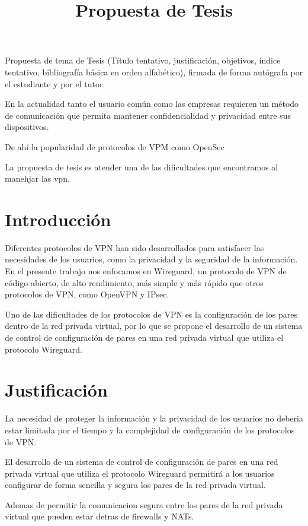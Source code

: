 \documentclass{article}
\title{Propuesta de Tesis}
\begin{document}
\maketitle

Propuesta de tema de Tesis (Título tentativo, justificación, objetivos, índice tentativo, bibliografía básica en orden alfabético), firmada de forma autógrafa por el estudiante y por el tutor.

En la actualidad tanto el usuario común como las empresas requieren un método de comunicación que permita mantener confidencialidad y privacidad entre sus dispositivos.

De ahí la popularidad de protocolos de VPM como OpenSec

La propuesta de tesis es atender una de las dificultades que encontramos al manehjar las vpn.


\section{Introducción}
Diferentes protocolos de VPN han sido desarrollados para satisfacer las necesidades de los usuarios, como la privacidad y la seguridad de la información.
En el presente trabajo nos enfocamos en Wireguard, un protocolo de VPN de código abierto, de alto rendimiento, más simple y más rápido que otros protocolos de VPN, como OpenVPN y IPsec.

Uno de las dificultades de los protocolos de VPN es la configuración de los pares dentro de la red privada virtual, por lo que se propone el desarrollo de un sistema de control de configuración de pares en una red privada virtual que utiliza el protocolo Wireguard.

\section{Justificación}

La necesidad de proteger la información y la privacidad de los usuarios no deberia estar limitada por el tiempo y la complejidad de configuración de los protocolos de VPN. 

El desarrollo de un sistema de control de configuración de pares en una red privada virtual que utiliza el protocolo Wireguard permitirá a los usuarios configurar de forma sencilla y segura los pares de la red privada virtual.

Ademas de permitir la comunicacion segura entre los pares de la red privada virtual que pueden estar detras de firewalls y NATs.
\end{document}
